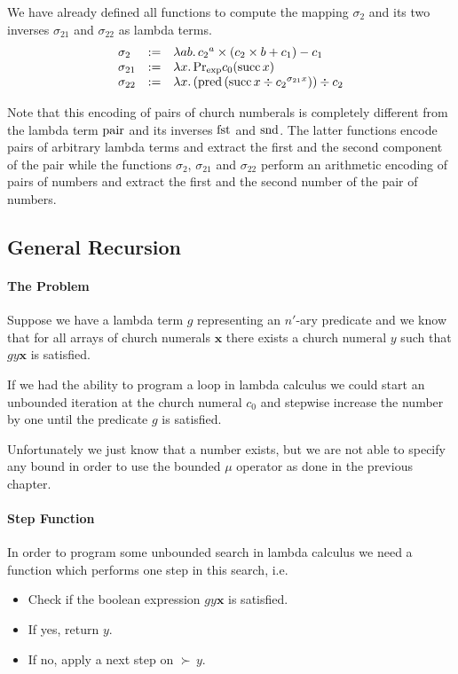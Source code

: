 We have already defined all functions to compute the mapping $\sigma_2$ and its two
inverses $\sigma_{21}$ and $\sigma_{22}$ as lambda terms.
$$
\begin{array}{lll}
  \sigma_2 &:= &\lambda a b.\,  {c_2}^a \times (c_2 \times b + c_1) - c_1
  \\
  \sigma_{21} &:=& \lambda x.\, \text{Pr}_{\text{exp}} c_0 (\text{succ}\, x)
  \\
  \sigma_{22} &:=& \lambda x.\,(\text{pred}\, (\text{succ}\, x\div {c_2}^{\sigma_{21} x}))
                   \div c_2
\end{array}
$$

Note that this encoding of pairs of church numberals is completely different
from the lambda term $\text{pair}$ and its inverses $\text{fst}$ and $\text{snd}$. The latter
functions encode pairs of arbitrary lambda terms and extract the first and the
second component of the pair while the functions $\sigma_2$, $\sigma_{21}$ and
$\sigma_{22}$ perform an arithmetic encoding of pairs of numbers and extract
the first and the second number of the pair of numbers.




\subsection{General Recursion}

\paragraph{The Problem} Suppose we have a lambda term $g$ representing an
$n'$-ary predicate and we know that for all arrays of church numerals
$\mathbf{x}$ there exists a church numeral $y$ such that $g y \mathbf{x}$ is
satisfied.

If we had the ability to program a loop in lambda calculus we could start an
unbounded iteration at the church numeral $c_0$ and stepwise increase the
number by one until the predicate $g$ is satisfied.

Unfortunately we just know that a number exists, but we are not able to
specify any bound in order to use the bounded $\mu$ operator as done in the
previous chapter.

\paragraph{Step Function} In order to program some unbounded search in lambda
calculus we need a function which performs one step in this search, i.e.
\begin{itemize}
\item Check if the boolean expression $g y \mathbf{x}$ is satisfied.
\item If yes, return $y$.
\item If no, apply a next step on $\succ\, y$.
\end{itemize}

